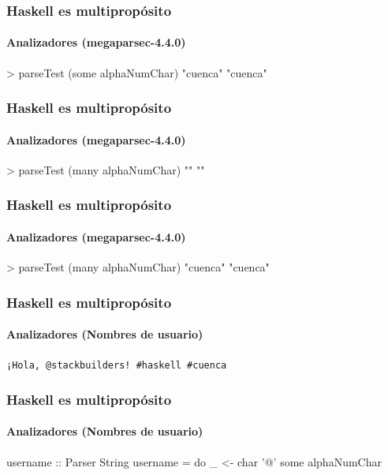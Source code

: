 \documentclass[spanish]{beamer}
\begin{document}

\begin{frame}[fragile]
  \frametitle{Haskell es multipropósito}
  \framesubtitle{Analizadores (megaparsec-4.4.0)}

  \begin{code}
> parseTest (some alphaNumChar) "cuenca"
"cuenca"
  \end{code}
\end{frame}


\begin{frame}[fragile]
  \frametitle{Haskell es multipropósito}
  \framesubtitle{Analizadores (megaparsec-4.4.0)}

  \begin{code}
> parseTest (many alphaNumChar) ""
""
  \end{code}
\end{frame}


\begin{frame}[fragile]
  \frametitle{Haskell es multipropósito}
  \framesubtitle{Analizadores (megaparsec-4.4.0)}

  \begin{code}
> parseTest (many alphaNumChar) "cuenca"
"cuenca"
  \end{code}
\end{frame}


\begin{frame}
  \frametitle{Haskell es multipropósito}
  \framesubtitle{Analizadores (Nombres de usuario)}

  \texttt{¡Hola, @\alert{stackbuilders}! \#haskell \#cuenca}
\end{frame}



\begin{frame}[fragile]
  \frametitle{Haskell es multipropósito}
  \framesubtitle{Analizadores (Nombres de usuario)}

  \begin{code}
username :: Parser String
username = do
  _ <- char '@'
  some alphaNumChar
  \end{code}
\end{frame}
\end{document}
